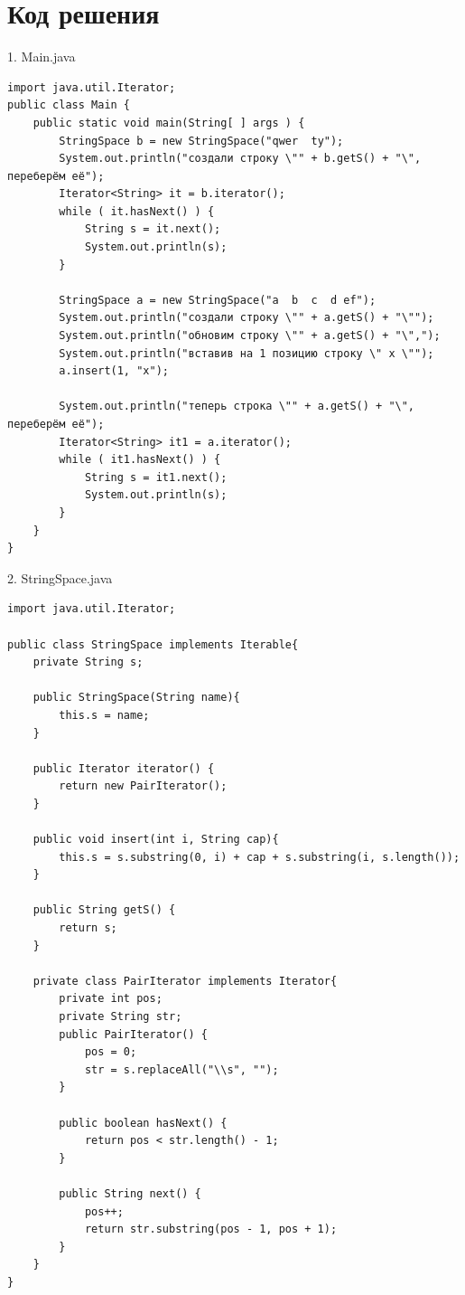 ﻿\documentclass[a4paper, 12pt]{extarticle}
\begin{document}
\section{Код решения}
1. Main.java
\begin{verbatim}
import java.util.Iterator;
public class Main {
    public static void main(String[ ] args ) {
        StringSpace b = new StringSpace("qwer  ty");
        System.out.println("создали строку \"" + b.getS() + "\", переберём её");
        Iterator<String> it = b.iterator();
        while ( it.hasNext() ) {
            String s = it.next();
            System.out.println(s);
        }

        StringSpace a = new StringSpace("a  b  c  d ef");
        System.out.println("создали строку \"" + a.getS() + "\"");
        System.out.println("обновим строку \"" + a.getS() + "\",");
        System.out.println("вставив на 1 позицию строку \" х \"");
        a.insert(1, "x");

        System.out.println("теперь строка \"" + a.getS() + "\", переберём её");
        Iterator<String> it1 = a.iterator();
        while ( it1.hasNext() ) {
            String s = it1.next();
            System.out.println(s);
        }
    }
}
\end{verbatim}
2. StringSpace.java
\begin{verbatim}
import java.util.Iterator;

public class StringSpace implements Iterable{
    private String s;

    public StringSpace(String name){
        this.s = name;
    }

    public Iterator iterator() {
        return new PairIterator();
    }

    public void insert(int i, String cap){
        this.s = s.substring(0, i) + cap + s.substring(i, s.length());
    }

    public String getS() {
        return s;
    }

    private class PairIterator implements Iterator{
        private int pos;
        private String str;
        public PairIterator() {
            pos = 0;
            str = s.replaceAll("\\s", "");
        }

        public boolean hasNext() {
            return pos < str.length() - 1;
        }

        public String next() {
            pos++;
            return str.substring(pos - 1, pos + 1);
        }
    }
}

\end{verbatim}
\end{document}
